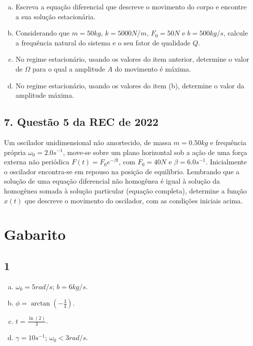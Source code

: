 \documentclass[a4paper,10pt]{article}
\begin{document}
\begin{enumerate}[(a)]
\item Escreva a equação diferencial que descreve o movimento do corpo e encontre a
sua solução estacionária.

\item Considerando que $m = 50 \unit{kg}$, $k = 5000 \unit{N/m}$, $F_0 = 50 \unit{N}$ e $b = 500 \unit{kg/s}$, calcule
a frequência natural do sistema e o seu fator de qualidade $Q$.

\item No regime estacionário, usando os valores do item anterior, determine o valor
de $\Omega$ para o qual a amplitude $A$ do movimento é máxima.

\item No regime estacionário, usando os valores do item (b), determine o valor da
amplitude máxima.
\end{enumerate}

\n

\subsection*{7. Questão 5 da REC de 2022}

Um oscilador unidimensional não amortecido, de massa $m = 0.50 \unit{kg}$ e frequência
própria $\omega_0 = 2.0 \unit{s^{-1}}$, move-se sobre um plano horizontal sob a ação de uma força externa não
periódica $F(t) = F_0 e^{-\beta t}$, com $F_0 = 40 \unit{N}$ e $\beta = 6.0 \unit{s^{-1}}$. Inicialmente o oscilador
encontra-se em repouso na posição de equilíbrio. Lembrando que a solução de uma equação diferencial não homogênea
é igual à solução da homogênea somada à solução particular (equação completa), determine a função
$x(t)$ que descreve o movimento do oscilador, com as condições iniciais acima.

\pagebreak

\section*{Gabarito}

\subsection*{1}

\begin{enumerate}[(a)]
\item $\omega_0 = 5 \unit{rad/s}$; $b = 6 \unit{kg/s}$.

\item $\phi = \arctan(-\frac{3}{4})$.

\item $t = \frac{\ln(2)}{3}$.

\item $\gamma = 10 \unit{s^{-1}}$; $\omega_0 < 3 \unit{rad/s}$.
\end{enumerate}
\end{document}
